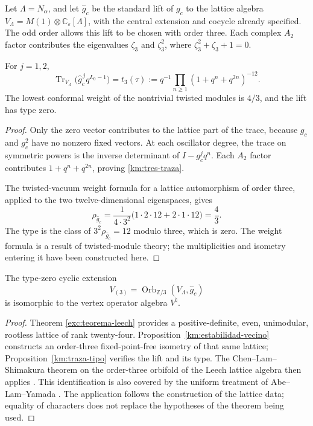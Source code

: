 Let \(\Lambda=N_\alpha\), and let \(\widehat g_c\) be the standard
lift of \(g_c\) to the lattice algebra
\(V_\Lambda=M(1)\otimes\mathbb C_\varepsilon[\Lambda]\), with the
central extension and cocycle already specified. The odd order
allows this lift to be chosen with order three. Each complex \(A_2\)
factor contributes the eigenvalues \(\zeta_3\) and \(\zeta_3^2\),
where \(\zeta_3^2+\zeta_3+1=0\).

\begin{proposition}
\label{km:traza-tipo}
For \(j=1,2\),
\begin{equation}
 \operatorname{Tr}_{V_\Lambda}
       \bigl(\widehat g_c^{\,j}q^{L_0-1}\bigr)
 =t_3(\tau)
 :=q^{-1}\prod_{n\ge1}(1+q^n+q^{2n})^{-12}.
 \label{km:tres-traza}
\end{equation}
The lowest conformal weight of the nontrivial twisted modules is
\(4/3\), and the lift has type zero.
\end{proposition}
\begin{proof}
Only the zero vector contributes to the lattice part of the trace,
because \(g_c\) and \(g_c^2\) have no nonzero fixed vectors.
At each oscillator degree, the trace on symmetric powers is the
inverse determinant of \(I-g_c^jq^n\). Each \(A_2\) factor
contributes \(1+q^n+q^{2n}\), proving \eqref{km:tres-traza}.

The twisted-vacuum weight formula for a lattice automorphism of
order three, applied to the two twelve-dimensional eigenspaces, gives
\[
 \rho_{\widehat g_c}
 =\frac{1}{4\cdot3^2}
   \bigl(1\cdot2\cdot12+2\cdot1\cdot12\bigr)=\frac43.
\]
The type is the class of \(3^2\rho_{\widehat g_c}=12\) modulo
three, which is zero. The weight formula is a result of twisted-module
theory; the multiplicities and isometry entering it have been
constructed here.
\end{proof}

\begin{theorem}
\label{km:moonshine-tres}
The type-zero cyclic extension
\begin{equation}
 V_{(3)}=\operatorname{Orb}_{\mathbb Z/3}
                 (V_\Lambda,\widehat g_c)
 \label{km:extension-orden3}
\end{equation}
is isomorphic to the vertex operator algebra \(V^\natural\).
\end{theorem}
\begin{proof}
Theorem \ref{exc:teorema-leech} provides a positive-definite, even,
unimodular, rootless lattice of rank twenty-four.
Proposition~\ref{km:estabilidad-vecino} constructs an order-three
fixed-point-free isometry of that same lattice;
Proposition~\ref{km:traza-tipo} verifies the lift and its type.
The Chen--Lam--Shimakura theorem on the order-three orbifold of
the Leech lattice algebra then applies
\cite[Theorem~1.1]{chenlamshimakura2016}. This identification is
also covered by the uniform treatment of Abe--Lam--Yamada
\cite[Theorem~4.4 and Sections~2--4]{abelamyamada2017}.
The application follows the construction of the lattice data;
equality of characters does not replace the hypotheses of the theorem
being used.
\end{proof}

